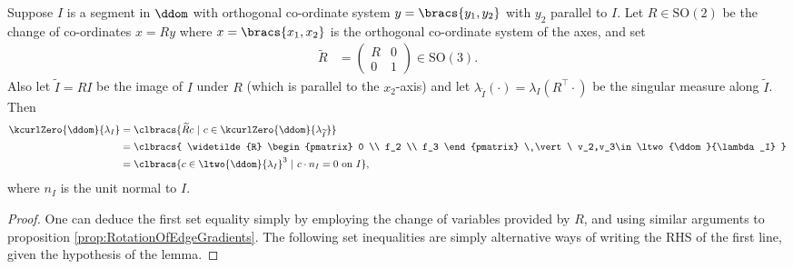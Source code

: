 \begin{lemma} \label{lem:kCurlZeroAnySegment}
	Suppose $I$ is a segment in $\ddom$ with orthogonal co-ordinate system $y=\bracs{y_1,y_2}$ with $y_2$ parallel to $I$.
	Let $R\in\mathrm{SO}(2)$ be the change of co-ordinates $x=Ry$ where $x=\bracs{x_1,x_2}$ is the orthogonal co-ordinate system of the axes, and set
	\begin{align*}
		\widetilde{R} &= \begin{pmatrix} R & 0 \\ 0 & 1 \end{pmatrix} \in \mathrm{SO}(3).
	\end{align*}
	Also let $\widetilde{I} = RI$ be the image of $I$ under $R$ (which is parallel to the $x_2$-axis) and let $\lambda_{\widetilde{I}}(\cdot) = \lambda_I(R^{\top}\cdot)$ be the singular measure along $\widetilde{I}$.
	Then
	\begin{align*}
		\kcurlZero{\ddom}{\lambda_I} &= \clbracs{\widetilde{R}c \ \vert \ c\in\kcurlZero{\ddom}{\lambda_{\widetilde{I}}}} \\
		&= \clbracs{
		\widetilde{R} \begin{pmatrix} 0 \\ f_2 \\ f_3	\end{pmatrix} \ \vert \ v_2,v_3\in\ltwo{\ddom}{\lambda_I}
		} \\
		&= \clbracs{c\in\ltwo{\ddom}{\lambda_I}^3 \ \vert \ c\cdot n_I = 0 \text{ on } I},
	\end{align*}
	where $n_I$ is the unit normal to $I$.
\end{lemma}
\begin{proof}
	One can deduce the first set equality simply by employing the change of variables provided by $R$, and using similar arguments to proposition \ref{prop:RotationOfEdgeGradients}.
	The following set inequalities are simply alternative ways of writing the RHS of the first line, given the hypothesis of the lemma.
\end{proof}

